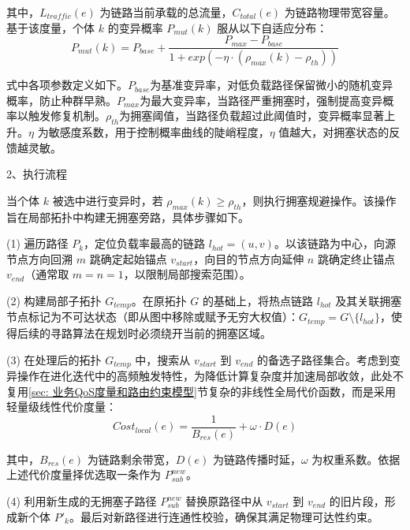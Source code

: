 \documentclass[print, master, vlined]{DissertUESTC}
\begin{document}
    其中，$L_{traffic}(e)$ 为链路当前承载的总流量，$C_{total}(e)$ 为链路物理带宽容量。基于该度量，个体 $k$ 的变异概率 $P_{mut}(k)$ 服从以下自适应分布：
    \begin{equation}
        P_{mut}(k) = P_{base} + \frac{P_{max} - P_{base}}{1 + exp(-\eta \cdot (\rho_{max}(k) - \rho_{th}))}
    \end{equation}
    
    式中各项参数定义如下。$P_{base}$为基准变异率，对低负载路径保留微小的随机变异概率，防止种群早熟。$P_{max}$为最大变异率，当路径严重拥塞时，强制提高变异概率以触发修复机制。$\rho_{th}$为拥塞阈值，当路径负载超过此阈值时，变异概率显著上升。$\eta$ 为敏感度系数，用于控制概率曲线的陡峭程度，$\eta$ 值越大，对拥塞状态的反馈越灵敏。
    
    2、执行流程
    
    当个体 $k$ 被选中进行变异时，若 $\rho_{max}(k) \ge \rho_{th}$，则执行拥塞规避操作。该操作旨在局部拓扑中构建无拥塞旁路，具体步骤如下。
    
    (1) 遍历路径 $P_k$，定位负载率最高的链路 $l_{hot} = (u, v)$。以该链路为中心，向源节点方向回溯 $m$ 跳确定起始锚点 $v_{start}$，向目的节点方向延伸 $n$ 跳确定终止锚点 $v_{end}$（通常取 $m=n=1$，以限制局部搜索范围）。
    
    (2) 构建局部子拓扑 $G_{temp}$。在原拓扑 $G$ 的基础上，将热点链路 $l_{hot}$ 及其关联拥塞节点标记为不可达状态（即从图中移除或赋予无穷大权值）：$G_{temp} = G \setminus \{l_{hot}\}$，使得后续的寻路算法在规划时必须绕开当前的拥塞区域。
    
    (3) 在处理后的拓扑 $G_{temp}$ 中，搜索从 $v_{start}$ 到 $v_{end}$ 的备选子路径集合。考虑到变异操作在进化迭代中的高频触发特性，为降低计算复杂度并加速局部收敛，此处不复用\ref{sec: 业务QoS度量和路由约束模型}节复杂的非线性全局代价函数，而是采用轻量级线性代价度量：
    \begin{equation}
        Cost_{local}(e) = \frac{1}{B_{res}(e)} + \omega \cdot D(e)
    \end{equation}
    
    其中，$B_{res}(e)$ 为链路剩余带宽，$D(e)$ 为链路传播时延，$\omega$ 为权重系数。依据上述代价度量择优选取一条作为 $P_{sub}^{new}$。
    
    (4) 利用新生成的无拥塞子路径 $P_{sub}^{new}$ 替换原路径中从 $v_{start}$ 到 $v_{end}$ 的旧片段，形成新个体 $P'_k$。最后对新路径进行连通性校验，确保其满足物理可达性约束。
    
\end{document}
